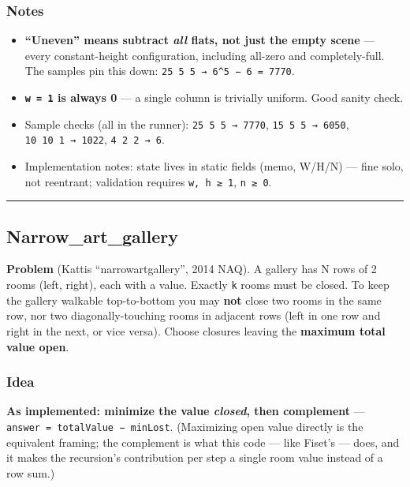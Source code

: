 \documentclass[
  10pt,
  letterpaper,
  onecolumn]{article}
\providecommand{\tightlist}{%
  \setlength{\itemsep}{0pt}\setlength{\parskip}{0pt}}
\begin{document}
\hypertarget{notes-10}{%
\subsubsection{Notes}\label{notes-10}}

\begin{itemize}
\tightlist
\item
  \textbf{``Uneven'' means subtract \emph{all} flats, not just the empty
  scene} --- every constant-height configuration, including all-zero and
  completely-full. The samples pin this down:
  \texttt{25\ 5\ 5\ →\ 6\^{}5\ −\ 6\ =\ 7770}.
\item
  \textbf{\texttt{w\ =\ 1} is always 0} --- a single column is trivially
  uniform. Good sanity check.
\item
  Sample checks (all in the runner): \texttt{25\ 5\ 5\ →\ 7770},
  \texttt{15\ 5\ 5\ →\ 6050}, \texttt{10\ 10\ 1\ →\ 1022},
  \texttt{4\ 2\ 2\ →\ 6}.
\item
  Implementation notes: state lives in static fields (memo, W/H/N) ---
  fine solo, not reentrant; validation requires \texttt{w,\ h\ ≥\ 1},
  \texttt{n\ ≥\ 0}.
\end{itemize}

\begin{center}\rule{0.5\linewidth}{0.5pt}\end{center}

\hypertarget{narrow_art_gallery}{%
\subsection{Narrow\_art\_gallery}\label{narrow_art_gallery}}

\textbf{Problem} (Kattis ``narrowartgallery'', 2014 NAQ). A gallery has
N rows of 2 rooms (left, right), each with a value. Exactly \texttt{k}
rooms must be closed. To keep the gallery walkable top-to-bottom you may
\textbf{not} close two rooms in the same row, nor two
diagonally-touching rooms in adjacent rows (left in one row and right in
the next, or vice versa). Choose closures leaving the \textbf{maximum
total value open}.

\hypertarget{idea-13}{%
\subsubsection{Idea}\label{idea-13}}

\textbf{As implemented: minimize the value \emph{closed}, then
complement} --- \texttt{answer\ =\ totalValue\ −\ minLost}. (Maximizing
open value directly is the equivalent framing; the complement is what
this code --- like Fiset's --- does, and it makes the recursion's
contribution per step a single room value instead of a row sum.)
\end{document}
